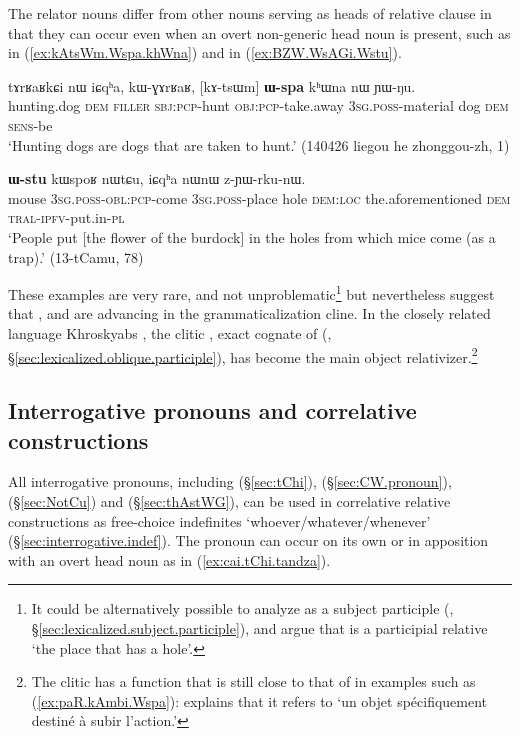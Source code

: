The relator nouns differ from other nouns serving as heads of relative clause in that they can occur even when an overt non-generic head noun is present, such as  in (\ref{ex:kAtsWm.Wspa.khWna}) and  in (\ref{ex:BZW.WsAGi.Wstu}). 

 \begin{exe}
\ex \label{ex:kAtsWm.Wspa.khWna} 
\gll  tɤrʁaʁkɕi nɯ iɕqʰa, kɯ-ɣɤrʁaʁ, [kɤ-tsɯm] \textbf{ɯ-spa} kʰɯna nɯ ɲɯ-ŋu. \\
hunting.dog \textsc{dem} \textsc{filler} \textsc{sbj}:\textsc{pcp}-hunt \textsc{obj}:\textsc{pcp}-take.away \textsc{3sg}.\textsc{poss}-material dog \textsc{dem} \textsc{sens}-be \\
\glt `Hunting dogs are dogs that are taken to hunt.' (140426 liegou he zhonggou-zh, 1)
\end{exe}  

 \begin{exe}
\ex \label{ex:BZW.WsAGi.Wstu} 
\gll  [βʑɯ ɯ-sɤ-ɣi] \textbf{ɯ-stu} kɯspoʁ nɯtɕu, iɕqʰa nɯnɯ z-ɲɯ-rku-nɯ. \\
mouse \textsc{3sg}.\textsc{poss}-\textsc{obl}:\textsc{pcp}-come \textsc{3sg}.\textsc{poss}-place hole \textsc{dem}:\textsc{loc} the.aforementioned \textsc{dem} \textsc{tral}-\textsc{ipfv}-put.in-\textsc{pl} \\
\glt `People put [the flower of the burdock] in the holes from which mice come (as a trap).' (13-tCamu, 78)
\end{exe}  
  
These examples are very rare, and not unproblematic\footnote{It could be alternatively possible to analyze  as a subject participle   (, §\ref{sec:lexicalized.subject.participle}), and argue that  is a participial relative `the place that has a hole'. }  but nevertheless suggest that ,  and  are advancing in the grammaticalization cline.   In the closely related language Khroskyabs \citep[580]{lai17khroskyabs}, the clitic , exact cognate of   (, §\ref{sec:lexicalized.oblique.participle}), has become the main object relativizer.\footnote{The clitic  has a function that is still close to that of  in examples such as (\ref{ex:paR.kAmbi.Wspa}):   \citet[514]{lai17khroskyabs} explains that it refers to `un objet spécifiquement destiné à subir l’action.'  }
 
  
\subsection{Interrogative pronouns and correlative constructions} \label{sec:interrogative.relative}
All interrogative pronouns, including   (§\ref{sec:tChi}),  (§\ref{sec:CW.pronoun}),   (§\ref{sec:NotCu}) and  (§\ref{sec:thAstWG}), can be used in correlative relative constructions as free-choice indefinites `whoever/whatever/whenever' (§\ref{sec:interrogative.indef}). The pronoun can occur on its own or in apposition with an overt head noun as in (\ref{ex:cai.tChi.tandza}).


